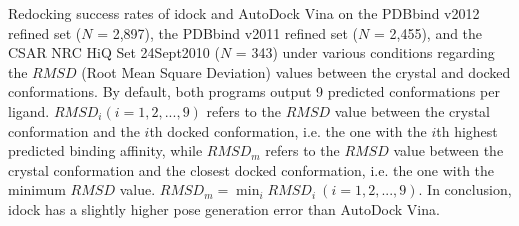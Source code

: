 \documentclass[10pt]{article}
\begin{document}
\begin{table}[!ht]
\begin{flushleft}\label{SuccessRate} Redocking success rates of idock and AutoDock Vina on the PDBbind v2012 refined set ($N$ = 2,897), the PDBbind v2011 refined set ($N$ = 2,455), and the CSAR NRC HiQ Set 24Sept2010 ($N$ = 343) under various conditions regarding the $RMSD$ (Root Mean Square Deviation) values between the crystal and docked conformations. By default, both programs output 9 predicted conformations per ligand. $RMSD_i (i = 1,2,...,9)$ refers to the $RMSD$ value between the crystal conformation and the $i$th docked conformation, i.e. the one with the $i$th highest predicted binding affinity, while $RMSD_m$ refers to the $RMSD$ value between the crystal conformation and the closest docked conformation, i.e. the one with the minimum $RMSD$ value. $RMSD_m = \displaystyle\min_{i}RMSD_i\ (i = 1,2,...,9)$. In conclusion, idock has a slightly higher pose generation error than AutoDock Vina.
\end{flushleft}
\end{table}
\end{document}
